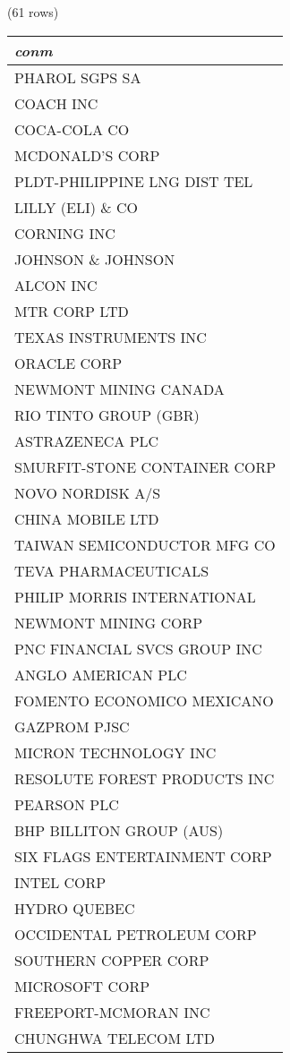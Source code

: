 \noindent (61 rows) \\

\begin{tabular}{l}
\textit{conm} \\
\hline
PHAROL SGPS SA \\
COACH INC \\
COCA-COLA CO \\
MCDONALD'S CORP \\
PLDT-PHILIPPINE LNG DIST TEL \\
LILLY (ELI) \& CO \\
CORNING INC \\
JOHNSON \& JOHNSON \\
ALCON INC \\
MTR CORP LTD \\
TEXAS INSTRUMENTS INC \\
ORACLE CORP \\
NEWMONT MINING CANADA \\
RIO TINTO GROUP (GBR) \\
ASTRAZENECA PLC \\
SMURFIT-STONE CONTAINER CORP \\
NOVO NORDISK A/S \\
CHINA MOBILE LTD \\
TAIWAN SEMICONDUCTOR MFG CO \\
TEVA PHARMACEUTICALS \\
PHILIP MORRIS INTERNATIONAL \\
NEWMONT MINING CORP \\
PNC FINANCIAL SVCS GROUP INC \\
ANGLO AMERICAN PLC \\
FOMENTO ECONOMICO MEXICANO \\
GAZPROM PJSC \\
MICRON TECHNOLOGY INC \\
RESOLUTE FOREST PRODUCTS INC \\
PEARSON PLC \\
BHP BILLITON GROUP (AUS) \\
SIX FLAGS ENTERTAINMENT CORP \\
INTEL CORP \\
HYDRO QUEBEC \\
OCCIDENTAL PETROLEUM CORP \\
SOUTHERN COPPER CORP \\
MICROSOFT CORP \\
FREEPORT-MCMORAN INC \\
CHUNGHWA TELECOM LTD \\

\end{tabular}
